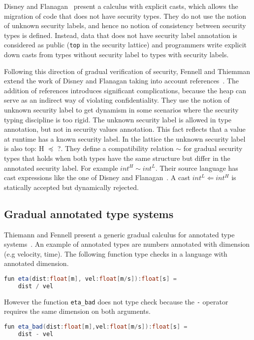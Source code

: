 \documentclass{article}
\newcommand\icode[1]{\texttt{#1}}
\begin{document}
Disney and Flanagan~\cite{disneyFlanagan:stop2011} present a calculus with explicit casts, which allows the migration of code that does not have security types. They do not use the notion of unknown security labels, and hence no notion of consistency between security types is defined. Instead, data that does not have security label annotation is considered as public (\icode{top} in the security lattice) and programmers write explicit down casts from types without security label to types with security labels. 

Following this direction of gradual verification of security, Fennell and Thiemman extend the work of Disney and Flanagan taking into account references~\cite{fennellThiemann:csf2013}. The addition of references introduces significant complications, because the heap can serve as an indirect way of violating confidentiality. They use the notion of unknown security label to get dynamism in some scenarios where the security typing discipline is too rigid. The unknown security label is allowed in type annotation, but not in security values annotation. This fact reflects that a value at runtime has a known security label. In the lattice the unknown security label is also top: H $\preceq$ ?. They define a compatibility relation $\sim$ for gradual security types that holds when both types have the same structure but differ in the annotated security label. For example $int^{H} \sim int^{L}$. Their source language has cast expressions like the one of Disney and Flanagan~\cite{disneyFlanagan:stop2011}. A cast $int^{L} \Leftarrow int^{H}$ is statically accepted but dynamically rejected.

\subsection{Gradual annotated type systems}
Thiemann and Fennell present a generic gradual calculus for annotated type systems~\cite{thiemannFennell:esop2014}. An example of annotated types are numbers annotated with dimension (e.g velocity, time). The following function type checks in a language with annotated dimension.
\begin{lstlisting}[language=Java,tabsize=2]
fun eta(dist:float[m], vel:float[m/s]):float[s] =
	dist / vel
\end{lstlisting}
However the function \icode{eta\_bad} does not type check because the \icode{-} operator requires the same dimension on both arguments.
\begin{lstlisting}[language=Java,tabsize=2]
fun eta_bad(dist:float[m],vel:float[m/s]):float[s] =
	dist - vel
\end{lstlisting}
\end{document}
